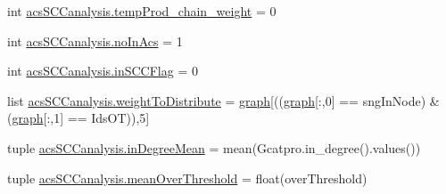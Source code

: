 \begin{DoxyCompactItemize}
\item 
int \hyperlink{a00130_aaf17c99825e0961e4cfaa173ddfffe84}{acs\+S\+C\+Canalysis.\+temp\+Prod\+\_\+chain\+\_\+weight} = 0
\item 
int \hyperlink{a00130_a4766b3ca835449f1aa287fda699c7f96}{acs\+S\+C\+Canalysis.\+no\+In\+Acs} = 1
\item 
int \hyperlink{a00130_a6405b6b05e7b87812422cc30d2034904}{acs\+S\+C\+Canalysis.\+in\+S\+C\+C\+Flag} = 0
\item 
list \hyperlink{a00130_a5162bfbe5eb2618736d1f77bb3125a9b}{acs\+S\+C\+Canalysis.\+weight\+To\+Distribute} = \hyperlink{a00028_a2745e24fec2a44d51f4452beb1596bd3}{graph}\mbox{[}((\hyperlink{a00028_a2745e24fec2a44d51f4452beb1596bd3}{graph}\mbox{[}\+:,0\mbox{]} == sng\+In\+Node) \& (\hyperlink{a00028_a2745e24fec2a44d51f4452beb1596bd3}{graph}\mbox{[}\+:,1\mbox{]} == Ids\+O\+T)),5\mbox{]}
\item 
tuple \hyperlink{a00130_a5004d18b8cfa2803620a9cd7f32d9775}{acs\+S\+C\+Canalysis.\+in\+Degree\+Mean} = mean(Gcatpro.\+in\+\_\+degree().values())
\item 
tuple \hyperlink{a00130_af10c3623be709892f4bdc4df5a3d52b0}{acs\+S\+C\+Canalysis.\+mean\+Over\+Threshold} = float(over\+Threshold)
\end{DoxyCompactItemize}
